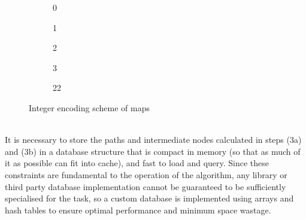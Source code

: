\documentclass[12pt,notitlepage]{report}
\begin{document}
\begin{figure}
    \centering
    \begin{subfigure}{.18\textwidth}
    \centering
    \caption{0}
    \end{subfigure}
    \begin{subfigure}{.18\textwidth}
    \centering
    \caption{1}
    \end{subfigure}
     \begin{subfigure}{.18\textwidth}
     \centering
    \caption{2}
    \end{subfigure}
    \begin{subfigure}{.18\textwidth}
    \centering
    \caption{3}
    \end{subfigure}
    \begin{subfigure}{.18\textwidth}
    \centering
    \caption{22}
    \end{subfigure}
  \caption{Integer encoding scheme of maps}
\end{figure}

\\
\noindent
It is necessary to store the paths and intermediate nodes calculated in steps (3a) and (3b) in a database structure that is compact in memory (so that as much of it as possible can fit into cache), and fast to load and query. Since these constraints are fundamental to the operation of the algorithm, any library or third party database implementation cannot be guaranteed to be sufficiently specialised for the task, so a custom database is implemented using arrays and hash tables to ensure optimal performance and minimum space wastage.\\
\end{document}
